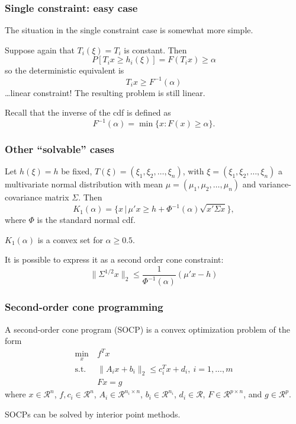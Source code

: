 \documentclass{beamer}
\def\cR{\mathcal{R}}
\begin{document}
\begin{frame}
\frametitle{Single constraint: easy case}

The situation in the single constraint case is somewhat more simple.

\mbox{}

Suppose again that $T_i (\xi) = T_i$ is constant. Then
\[
P[T_i x \geq h_i (\xi)] = F(T_i x) \geq \alpha
\]
so the deterministic equivalent is
\[
T_i x \geq F^{-1}(\alpha)
\]
\ldots linear constraint! The resulting problem is still linear.

\mbox{}

Recall that the inverse of the cdf is defined as
\[
F^{-1}(\alpha) = \min \lbrace x : F (x)  \geq \alpha \rbrace.
\]

\end{frame}

\begin{frame}
\frametitle{Other ``solvable'' cases}

Let $h(\xi) = h$ be fixed, $T(\xi) = (\xi_1, \xi_2,\ldots, \xi_n)$, with $\xi = (\xi_1, \xi_2,\ldots, \xi_n)$ a multivariate normal distribution with mean $\mu = (\mu_1, \mu_2,\ldots,\mu_n)$ and variance-covariance matrix $\Sigma$.
Then
\[
K_1(\alpha) = \lbrace x \,|\, \mu' x \geq h + \Phi^{-1}(\alpha) \sqrt{ x' \Sigma x } \rbrace,
\]
where $\Phi$ is the standard normal cdf.

\mbox{}

$K_1(\alpha)$ is a convex set for $\alpha \geq 0.5$.

\mbox{}

It is possible to express it as a second order cone constraint:
$$
\| \Sigma^{1/2} x \|_2 \leq \frac{1}{\Phi^{-1}(\alpha)} (\mu' x - h)
$$

\end{frame}

\begin{frame}
\frametitle{Second-order cone programming}

A second-order cone program (SOCP) is a convex optimization problem of the form
\begin{align*}
\min_x \ & f^T x \\
\mbox{s.t. } &
\| A_i x + b_i \|_2 \leq c_i^T x + d_i,\ i = 1,\ldots,m \\
& F x = g
\end{align*}
where $x \in \cR^n$, $f, c_i \in \cR^n$, $A_i \in \cR^{n_i \times n}$, $b_i \in \cR^{n_i}$, $d_i \in \cR$, $F \in \cR^{p \times n}$, and $g \in \cR^p$.

\mbox{}

SOCPs can be solved by interior point methods.

\end{frame}
\end{document}
